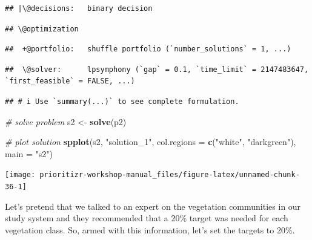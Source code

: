 \documentclass[12pt,]{book}
\newenvironment{Shaded}{\begin{snugshade}}{\end{snugshade}}
\newcommand{\CommentTok}[1]{\textcolor[rgb]{0.56,0.35,0.01}{\textit{#1}}}
\newcommand{\DataTypeTok}[1]{\textcolor[rgb]{0.13,0.29,0.53}{#1}}
\newcommand{\FloatTok}[1]{\textcolor[rgb]{0.00,0.00,0.81}{#1}}
\newcommand{\KeywordTok}[1]{\textcolor[rgb]{0.13,0.29,0.53}{\textbf{#1}}}
\newcommand{\NormalTok}[1]{#1}
\newcommand{\OperatorTok}[1]{\textcolor[rgb]{0.81,0.36,0.00}{\textbf{#1}}}
\newcommand{\OtherTok}[1]{\textcolor[rgb]{0.56,0.35,0.01}{#1}}
\newcommand{\StringTok}[1]{\textcolor[rgb]{0.31,0.60,0.02}{#1}}
\begin{document}
\begin{verbatim}
## |\@decisions:   binary decision
\end{verbatim}

\begin{verbatim}
## \@optimization
\end{verbatim}

\begin{verbatim}
##  +@portfolio:   shuffle portfolio (`number_solutions` = 1, ...)
\end{verbatim}

\begin{verbatim}
##  \@solver:      lpsymphony (`gap` = 0.1, `time_limit` = 2147483647, `first_feasible` = FALSE, ...)
\end{verbatim}

\begin{verbatim}
## # i Use `summary(...)` to see complete formulation.
\end{verbatim}

\begin{Shaded}
\begin{Highlighting}[]
\CommentTok{# solve problem}
\NormalTok{s2 <-}\StringTok{ }\KeywordTok{solve}\NormalTok{(p2)}

\CommentTok{# plot solution}
\KeywordTok{spplot}\NormalTok{(s2, }\StringTok{"solution_1"}\NormalTok{, }\DataTypeTok{col.regions =} \KeywordTok{c}\NormalTok{(}\StringTok{"white"}\NormalTok{, }\StringTok{"darkgreen"}\NormalTok{), }\DataTypeTok{main =} \StringTok{"s2"}\NormalTok{)}
\end{Highlighting}
\end{Shaded}

\begin{center}\texttt{[image: prioritizr-workshop-manual\_files/figure-latex/unnamed-chunk-36-1]} \end{center}

Let's pretend that we talked to an expert on the vegetation communities in our study system and they recommended that a 20\% target was needed for each vegetation class. So, armed with this information, let's set the targets to 20\%.

\begin{Shaded}
\end{Shaded}
\end{document}
